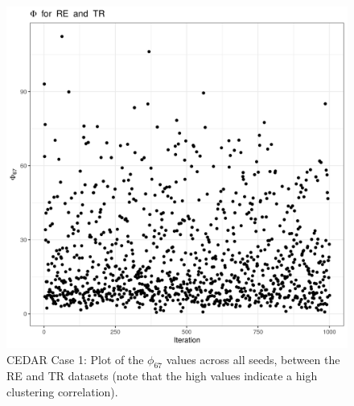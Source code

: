 \documentclass[12pt]{article} %
\begin{document}
	\begin{figure}[h]
		\centering
		\includegraphics[scale=0.75]{Images/Biology_data/Set_250/All_datasets/Phi_series_plots/file_1_Phi_67.png}
		\caption{CEDAR Case 1: Plot of the $\phi_{67}$ values across all seeds, between the RE and TR datasets (note that the high values indicate a high clustering correlation).}
		\label{fig:results:cedar_1:mdi_re_tr_phi_series_plot}
	\end{figure}

	\newpage
	
	
	
%
\end{document}
